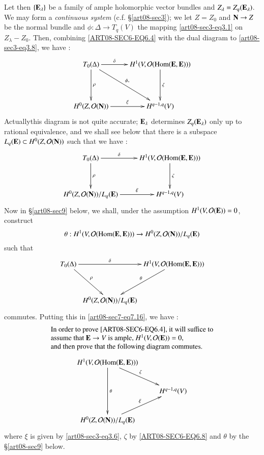 Let then $\{\mathbf{E}_{\lambda}\}$ be a family of ample holomorphic vector bundles and $Z_{\lambda}=Z_{q}(\mathbf{E}_{\lambda})$. We may form a {\em continuous system} (c.f. \S\ref{art08-sec3}); we let $Z=Z_{0}$ and $\mathbf{N}\to Z$ be the normal bundle and $\phi:\Delta\to T_{q}(V)$ the mapping \eqref{art08-sec3-eq3.1} on $Z_{\lambda}-Z_{0}$. Then, combining \eqref{ART08-SEC6-EQ6.4} with the dual diagram to \eqref{art08-sec3-eq3.8}, we have :
\begin{equation}
\vcenter{\xymatrix@R=1.5cm{
T_{0}(\Delta)\ar[r]^-{\delta}\ar[dr]^-{\phi_{*}}\ar[d]^-{\rho} & H^{1}(V,\mathcal{O}(\Hom(\bfE,\bfE)))\ar[d]^-{\zeta}\\
H^{0}(Z,\mathcal{O}(\bfN))\ar[r]^-{\xi} & H^{q-1,q}(V)
}}\label{art08-sec7-eq7.15}
\end{equation}
Actually\pageoriginale this diagram is not quite accurate; $\mathbf{E}_{\lambda}$ determines $Z_{q}(\mathbf{E}_{\lambda})$ only up to rational equivalence, and we shall see below that there is a subspace $L_{q}(\mathbf{E})\subset H^{0}(Z,\mathcal{O}(\mathbf{N}))$ such that we have :
\begin{equation}
\vcenter{\xymatrix@R=1.2cm{
T_{0}(\Delta)\ar[d]^-{\rho}\ar[r]^-{\delta} & H^{1}(V,\mathcal{O}(\Hom(\bfE,\bfE)))\ar[d]^-{\zeta}\\
H^{0}(Z,\mathcal{O}(\bfN))/L_{q}(\bfE)\ar[r]^-{\xi} & H^{q-1,q}(V)
}}\label{art08-sec7-eq7.16}
\end{equation}
Now in \S\ref{art08-sec9} below, we shall, under the assumption $H^{1}(V,\mathcal{O}(\mathbf{E}))=0$, construct
\begin{equation}
\theta : H^{1}(V,\mathcal{O}(\operatorname{\mathrm{Hom}}(\mathbf{E},\mathbf{E})))\to H^{0}(Z,\mathcal{O}(\mathbf{N}))/L_{q}(\mathbf{E})\label{art08-sec7-eq7.17}
\end{equation}
such that
\[
\xymatrix@C=.1cm@R=1.2cm{
T_{0}(\Delta)\ar[rr]^-{\delta}\ar[dr]^-{\rho} & & H^{1}(V,\mathcal{O}(\Hom(\bfE,\bfE)))\ar[dl]_-{\theta}\\
 & H^{0}(Z,\mathcal{O}(\bfN))/L_{q}(\bfE) & 
}
\]
commutes. Putting this in \eqref{art08-sec7-eq7.16}, we have :
\begin{equation}
\begin{array}{l}
\text{In order to prove \eqref{ART08-SEC6-EQ6.4}, it will suffice to}\\
\text{assume that $\mathbf{E}\to V$ is ample, $H^{1}(V,\mathcal{O}(\mathbf{E}))=0$,}\\
\text{and then prove that the following diagram commutes.}
\end{array}\label{art08-sec7-eq7.18}
\end{equation}
\begin{equation}
\vcenter{\xymatrix{
H^{1}(V,\mathcal{O}(\Hom(\bfE,\bfE)))\ar[dr]^-{\zeta}\ar[dd]^-{\theta} &\\
 & H^{q-1,q}(V)\\
H^{0}(Z,\mathcal{O}(\bfN))/L_{q}(\bfE)\ar[ur]^-{\xi} &
}}\label{art08-sec7-eq7.19}
\end{equation}
where $\xi$ is given by \eqref{art08-sec3-eq3.6}, $\zeta$ by \eqref{ART08-SEC6-EQ6.8} and $\theta$ by the \S\ref{art08-sec9} below.

